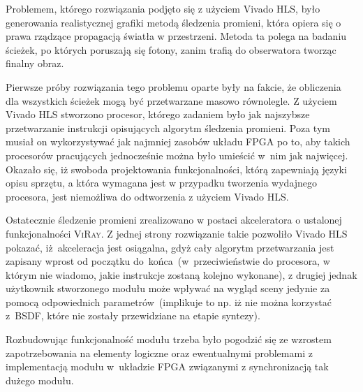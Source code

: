 Problemem, którego rozwiązania podjęto się z użyciem Vivado HLS, było generowania realistycznej grafiki metodą śledzenia promieni, która opiera się o prawa rządzące propagacją światła w przestrzeni. Metoda ta polega na badaniu ścieżek, po których poruszają się fotony, zanim trafią do obserwatora tworząc finalny obraz. 

Pierwsze próby rozwiązania tego problemu oparte były na fakcie, że obliczenia dla wszystkich ścieżek mogą być przetwarzane masowo równolegle. Z użyciem Vivado HLS stworzono procesor, którego zadaniem było jak najszybsze przetwarzanie instrukcji opisujących algorytm śledzenia promieni. Poza tym musiał on wykorzystywać jak najmniej zasobów układu FPGA po to, aby takich procesorów pracujących jednocześnie można było umieścić w~nim jak najwięcej. Okazało się, iż swoboda projektowania funkcjonalności, którą zapewniają języki opisu sprzętu, a która wymagana jest w przypadku tworzenia wydajnego procesora, jest niemożliwa do odtworzenia z użyciem Vivado HLS. 

Ostatecznie śledzenie promieni zrealizowano w postaci akceleratora o ustalonej funkcjonalności \textsc{ViRay}. Z jednej strony rozwiązanie takie pozwoliło Vivado HLS pokazać, iż~akceleracja jest osiągalna, gdyż cały algorytm przetwarzania jest zapisany wprost od początku do~końca~(w~przeciwieństwie do procesora, w którym nie wiadomo, jakie instrukcje zostaną kolejno wykonane), z drugiej jednak użytkownik stworzonego modułu może wpływać na wygląd sceny jedynie za pomocą odpowiednich parametrów~(implikuje to np. iż nie można korzystać z~BSDF, które nie zostały przewidziane na etapie syntezy). 

Rozbudowując funkcjonalność modułu trzeba było pogodzić się ze wzrostem zapotrzebowania na elementy logiczne oraz ewentualnymi problemami z implementacją modułu w~układzie FPGA związanymi z synchronizacją tak dużego modułu. 

